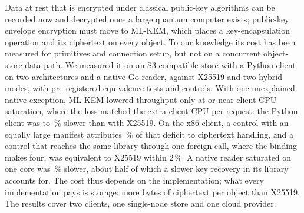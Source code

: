 Data at rest that is encrypted under classical public-key algorithms can be recorded now and
decrypted once a large quantum computer exists; public-key envelope encryption must move to
ML-KEM, which places a key-encapsulation operation and its ciphertext on every object. To our knowledge its cost
has been measured for primitives and connection setup, but not on a concurrent object-store
data path. We measured it on an S3-compatible store with a Python client on two
architectures and a native Go reader, against X25519 and two hybrid modes, with pre-registered equivalence tests and controls. With one unexplained native exception, ML-KEM lowered throughput only at or
near client CPU saturation, where the loss matched the extra client CPU per request: the Python client was
\RevHotDeficit{} to \ArmHotDeficit\,\% slower than with X25519. On the x86 client, a control
with an equally large manifest attributes \AudPadShare\,\% of that deficit to ciphertext
handling, and a control that reaches the same library through one foreign call, where the
binding makes four, was equivalent to X25519 within 2\,\%. A native reader saturated on one core
was \AudNOneMlkemDeficit\,\% slower, about half of which a slower key recovery in its library
accounts for. The cost thus depends on the implementation; what every implementation pays is storage:
\RevMetaIntrinsic{} more bytes of ciphertext per object than X25519. The results cover two
clients, one single-node store and one cloud provider.
